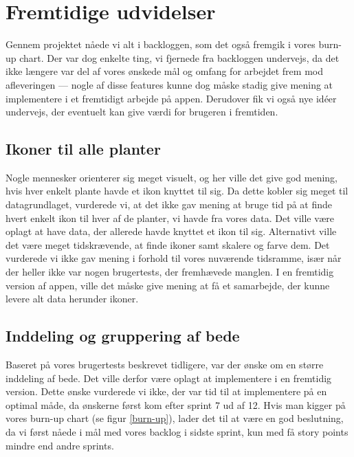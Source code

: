 \section{Fremtidige udvidelser}
Gennem projektet nåede vi alt i backloggen, som det også fremgik i vores burn-up chart. Der var dog enkelte ting, vi fjernede fra backloggen undervejs, da det ikke længere var del af vores ønskede mål og omfang for arbejdet frem mod afleveringen --- nogle af disse features kunne dog måske stadig give mening at implementere i et fremtidigt arbejde på appen. Derudover fik vi også nye idéer undervejs, der eventuelt kan give værdi for brugeren i fremtiden.

\subsection{Ikoner til alle planter}
\label{icons-for-plants}
Nogle mennesker orienterer sig meget visuelt, og her ville det give god mening, hvis hver enkelt plante havde et ikon knyttet til sig. Da dette kobler sig meget til datagrundlaget, vurderede vi, at det ikke gav mening at bruge tid på at finde hvert enkelt ikon til hver af de planter, vi havde fra vores data. Det ville være oplagt at have data, der allerede havde knyttet et ikon til sig. Alternativt ville det være meget tidskrævende, at finde ikoner samt skalere og farve dem. Det vurderede vi ikke gav mening i forhold til vores nuværende tidsramme, især når der heller ikke var nogen brugertests, der fremhævede manglen. I en fremtidig version af appen, ville det måske give mening at få et samarbejde, der kunne levere alt data herunder ikoner. 

\subsection{Inddeling og gruppering af bede}
\label{gruppering-af-bede}
Baseret på vores brugertests beskrevet tidligere, var der ønske om en større inddeling af bede. Det ville derfor være oplagt at implementere i en fremtidig version. Dette ønske vurderede vi ikke, der var tid til at implementere på en optimal måde, da ønskerne først kom efter sprint 7 ud af 12. Hvis man kigger på vores burn-up chart (se figur \ref{burn-up}), lader det til at være en god beslutning, da vi først nåede i mål med vores backlog i sidste sprint, kun med få story points mindre end andre sprints.

